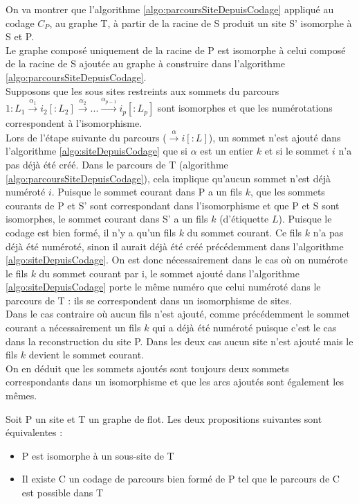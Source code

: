 \begin{pr}
On va montrer que l'algorithme \ref{algo:parcoursSiteDepuisCodage} appliqué au codage $C_P$, au graphe T, à partir de la racine de S produit un site S' isomorphe à S et P. \\
Le graphe composé uniquement de la racine de P est isomorphe à celui composé de la racine de S ajoutée au graphe à construire dans l'algorithme \ref{algo:parcoursSiteDepuisCodage}. \\
Supposons que les sous sites restreints aux sommets du parcours $1:L_1\xrightarrow{\alpha_1}i_2[:L_2]\xrightarrow{\alpha_2} ...\xrightarrow{\alpha_{p-1}}i_{p}[:L_{p}]$ sont isomorphes et que les numérotations correspondent à l'isomorphisme.\\
Lors de l'étape suivante du parcours ($\xrightarrow{\alpha}i[:L]$), un sommet n'est ajouté dans l'algorithme \ref{algo:siteDepuisCodage} que si $\alpha$ est un entier $k$ et si le sommet $i$ n'a pas déjà été créé. Dans le parcours de T (algorithme \ref{algo:parcoursSiteDepuisCodage}), cela implique qu'aucun sommet n'est déjà numéroté $i$. Puisque le sommet courant dans P a un fils $k$, que les sommets courants de P et S' sont correspondant dans l'isomorphisme et que P et S sont isomorphes, le sommet courant dans S' a un fils $k$ (d'étiquette $L$). Puisque le codage est bien formé, il n'y a qu'un fils $k$ du sommet courant. Ce fils $k$ n'a pas déjà été numéroté, sinon il aurait déjà été créé précédemment dans l'algorithme \ref{algo:siteDepuisCodage}. On est donc nécessairement dans le cas où on numérote le fils $k$ du sommet courant par i, le sommet ajouté dans l'algorithme \ref{algo:siteDepuisCodage} porte le même numéro que celui numéroté dans le parcours de T : ils se correspondent dans un isomorphisme de 
sites.\\
Dans le cas contraire où aucun fils n'est ajouté, comme précédemment le sommet courant a nécessairement un fils $k$ qui a déjà été numéroté puisque c'est le cas dans la reconstruction du site P. Dans les deux cas aucun site n'est ajouté mais le fils $k$ devient le sommet courant.\\
On en déduit que les sommets ajoutés sont toujours deux sommets correspondants dans un isomorphisme et que les arcs ajoutés sont également les mêmes.
\end{pr}

\begin{theo}
 Soit P un site et T un graphe de flot. Les deux propositions suivantes sont équivalentes :
 \begin{itemize}
  \item P est isomorphe à un sous-site de T
  \item Il existe C un codage de parcours bien formé de P tel que le parcours de C est possible dans T
 \end{itemize}
\label{theo:eqIsoCodage}
\end{theo}

